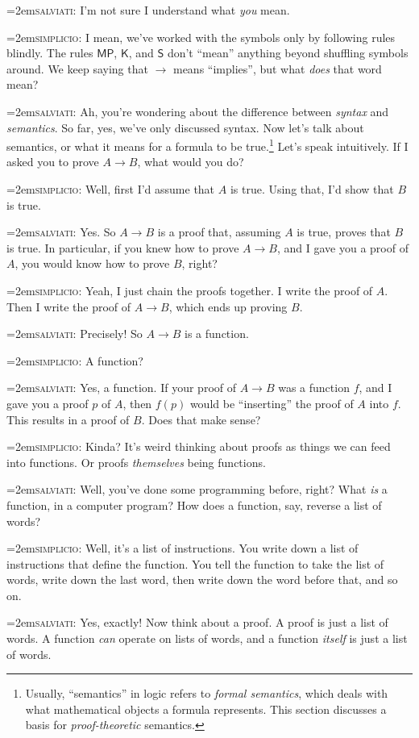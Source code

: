 \documentclass[11pt,paper=letter]{scrartcl}
\newcommand{\sf}{\mathsf}
\newcommand{\simp}{\vspace{0.5em}\noindent\hangindent=2em\textsc{simplicio:} }
\newcommand{\salv}{\vspace{0.5em}\noindent\hangindent=2em\textsc{salviati:} }
\begin{document}
\salv I'm not sure I understand what \emph{you} mean.

\simp I mean, we've worked with the symbols only by following rules blindly. The rules $\sf{MP}$, $\sf{K}$, and $\sf{S}$ don't ``mean'' anything beyond shuffling symbols around. We keep saying that $\to$ means ``implies'', but what \emph{does} that word mean?

\salv Ah, you're wondering about the difference between \emph{syntax} and \emph{semantics}. So far, yes, we've only discussed syntax. Now let's talk about semantics, or what it means for a formula to be true.\footnote{Usually, ``semantics'' in logic refers to \emph{formal semantics}, which deals with what mathematical objects a formula represents. This section discusses a basis for \textit{proof-theoretic} semantics.} Let's speak intuitively. If I asked you to prove $A \to B$, what would you do?

\simp Well, first I'd assume that $A$ is true. Using that, I'd show that $B$ is true.

\salv Yes. So $A \to B$ is a proof that, assuming $A$ is true, proves that $B$ is true. In particular, if you knew how to prove $A \to B$, and I gave you a proof of $A$, you would know how to prove $B$, right?

\simp Yeah, I just chain the proofs together. I write the proof of $A$. Then I write the proof of $A \to B$, which ends up proving $B$.

\salv Precisely! So $A \to B$ is a function.

\simp A function?

\salv Yes, a function. If your proof of $A \to B$ was a function $f$, and I gave you a proof $p$ of $A$, then $f(p)$ would be ``inserting'' the proof of $A$ into $f$. This results in a proof of $B$. Does that make sense?

\simp Kinda? It's weird thinking about proofs as things we can feed into functions. Or proofs \emph{themselves} being functions.

\salv Well, you've done some programming before, right? What \emph{is} a function, in a computer program? How does a function, say, reverse a list of words?

\simp Well, it's a list of instructions. You write down a list of instructions that define the function. You tell the function to take the list of words, write down the last word, then write down the word before that, and so on.

\salv Yes, exactly! Now think about a proof. A proof is just a list of words. A function \emph{can} operate on lists of words, and a function \emph{itself} is just a list of words.
\end{document}
